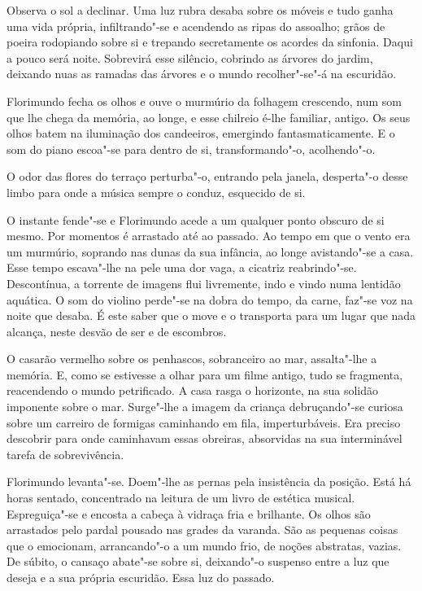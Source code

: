 Observa o sol a declinar. Uma luz rubra desaba sobre os móveis e tudo
ganha uma vida própria, infiltrando"-se e acendendo as ripas do assoalho;
grãos de poeira rodopiando sobre si e trepando secretamente os acordes
da sinfonia. Daqui a pouco será noite. Sobrevirá esse silêncio, cobrindo
as árvores do jardim, deixando nuas as ramadas das árvores e o mundo
recolher"-se"-á na escuridão.

Florimundo fecha os olhos e ouve o murmúrio da folhagem crescendo, num
som que lhe chega da memória, ao longe, e esse chilreio é-lhe familiar,
antigo. Os seus olhos batem na iluminação dos candeeiros, emergindo
fantasmaticamente. E o som do piano escoa"-se para dentro de si,
transformando"-o, acolhendo"-o.

O odor das flores do terraço perturba"-o, entrando pela janela,
desperta"-o desse limbo para onde a música sempre o conduz, esquecido de
si.

O instante fende"-se e Florimundo acede a um qualquer ponto obscuro de si
mesmo. Por momentos é arrastado até ao passado. Ao tempo em que o vento
era um murmúrio, soprando nas dunas da sua infância, ao longe
avistando"-se a casa. Esse tempo escava"-lhe na pele uma dor vaga, a
cicatriz reabrindo"-se. Descontínua, a torrente de imagens flui
livremente, indo e vindo numa lentidão aquática. O som do violino
perde"-se na dobra do tempo, da carne, faz"-se voz na noite que desaba. É
este saber que o move e o transporta para um lugar que nada alcança,
neste desvão de ser e de escombros.

O casarão vermelho sobre os penhascos, sobranceiro ao mar, assalta"-lhe a
memória. E, como se estivesse a olhar para um filme antigo, tudo se
fragmenta, reacendendo o mundo petrificado. A casa rasga o horizonte, na
sua solidão imponente sobre o mar. Surge"-lhe a imagem da criança
debruçando"-se curiosa sobre um carreiro de formigas caminhando em fila,
imperturbáveis. Era preciso descobrir para onde caminhavam essas
obreiras, absorvidas na sua interminável tarefa de sobrevivência.

Florimundo levanta"-se. Doem"-lhe as pernas pela insistência da posição.
Está há horas sentado, concentrado na leitura de um livro de estética
musical. Espreguiça"-se e encosta a cabeça à vidraça fria e brilhante. Os
olhos são arrastados pelo pardal pousado nas grades da varanda. São as
pequenas coisas que o emocionam, arrancando"-o a um mundo frio, de noções
abstratas, vazias. De súbito, o cansaço abate"-se sobre si, deixando"-o
suspenso entre a luz que deseja e a sua própria escuridão. Essa luz do
passado.

